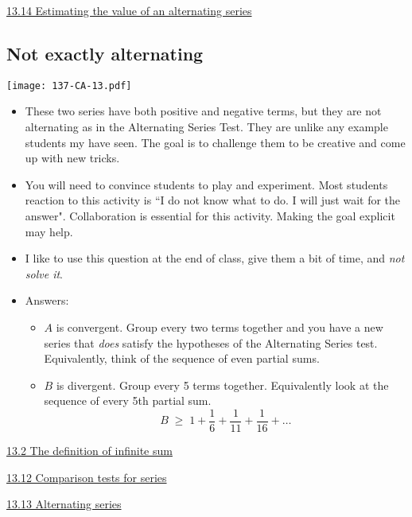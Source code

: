\documentclass[11pt]{article}
\newcommand{\nl}{\hfill \vspace{-1.1\baselineskip}} %
\newcommand{\vii}{\hspace{8mm} \href{https://www.youtube.com/watch?v=VccmKguRkeY&list=PLlwePzQY_wW-FJMnD_ybkXU_jZLVtZttI&index=2}{13.2 The definition of infinite sum} }
\newcommand{\vxii}{\hspace{8mm} \href{https://www.youtube.com/watch?v=QbYK4COJUqU&list=PLlwePzQY_wW-FJMnD_ybkXU_jZLVtZttI&index=12}{13.12 Comparison tests for series} }
\newcommand{\vxiii}{\hspace{8mm} \href{https://www.youtube.com/watch?v=OM9U6Pwze8E&list=PLlwePzQY_wW-FJMnD_ybkXU_jZLVtZttI&index=13}{13.13 Alternating series} }
\newcommand{\vxiv}{\hspace{8mm} \href{https://www.youtube.com/watch?v=NFhV-ZVg6pg&list=PLlwePzQY_wW-FJMnD_ybkXU_jZLVtZttI&index=14}{13.14 Estimating the value of an alternating series} }
\begin{document}
\begin{videos}
\vxiv
\end{videos}

\newpage
\subsection{Not exactly alternating}

\begin{center}
{ \texttt{[image: 137-CA-13.pdf]}} 
\end{center}


\begin{comments}
\nl
	\begin{itemize}
		\item   These two series have both positive and negative terms, but they are not alternating as in the Alternating Series Test.  They are unlike any example students my have seen.  The goal is to challenge them to be creative and come up with new tricks.
		\item You will need to convince students to play and experiment.    Most students reaction to this activity is ``I do not know what to do.  I will just wait for the answer".   Collaboration is essential for this activity.  Making the goal explicit may help.
		\item I like to use this question at the end of class, give them a bit of time, and \emph{not solve it}.
		\item Answers:
			\begin{itemize}
				\item  $A$ is convergent.   Group every two terms together and you have a new series that \emph{does} satisfy the hypotheses of the Alternating Series test.  Equivalently, think of the sequence of even partial sums.
				\item  $B$ is divergent.   Group every 5 terms together.  Equivalently look at the sequence of every 5th partial sum.   
					$$
						B \; \geq \; 1 + \frac{1}{6} + \frac{1}{11} + \frac{1}{16} + \ldots
					$$
			\end{itemize}
	\end{itemize}
\end{comments}

\begin{videos}
\vii

\vxii

\vxiii
\end{videos}

\newpage
\end{document}
